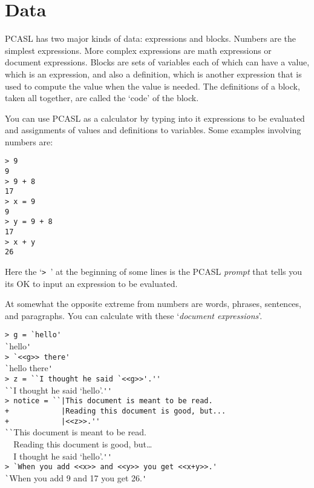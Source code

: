 \documentclass[12pt]{article}
\newcommand{\key}[1]{{\em #1}\index{#1}}
\newcommand{\skey}[2]{{\em #1#2}\index{#1}}
\newenvironment{indpar}[1][0.3in]%
	{\begin{list}{}%
		     {\setlength{\itemsep}{0in}%
		      \setlength{\topsep}{0in}%
		      \setlength{\parsep}{1ex}%
		      \setlength{\labelwidth}{#1}%
		      \setlength{\leftmargin}{#1}%
		      \addtolength{\leftmargin}{\labelsep}}%
	 \item}%
	{\end{list}}
\begin{document}
\section{Data}

PCASL has two major kinds of data: expressions and blocks.  Numbers are
the simplest expressions.  More complex expressions are math
expressions or document expressions.  Blocks are sets of variables
each of which can have a value, which is an expression, and also
a definition, which is another expression that is used to compute the
value when the value is needed.  The definitions of a block, taken all
together, are called the `code' of the block.

You can use PCASL as a calculator by typing into it expressions to
be evaluated and assignments of values and definitions to variables.
Some examples involving numbers are:

\begin{indpar}\begin{verbatim}
> 9
9
> 9 + 8
17
> x = 9
9
> y = 9 + 8
17
> x + y
26
\end{verbatim}\end{indpar}

Here the `\verb|> |' at the beginning of some lines is the PCASL \key{prompt}
that tells you its OK to input an expression to be evaluated.

At somewhat the opposite extreme from numbers are words, phrases, sentences,
and paragraphs.  You can calculate with these `\skey{document expression}s'.

\begin{indpar}
\verb|> g = `hello'| \\
\verb|`|hello\verb|'| \\
\verb|> `<<g>> there'| \\
\verb|`|hello there\verb|'| \\
\verb|> z = ``I thought he said `<<g>>'.''| \\
\verb|``|I thought he said `hello'.\verb|''| \\
\verb/> notice = ``|This document is meant to be read./ \\
\verb/+            |Reading this document is good, but.../ \\
\verb/+            |<<z>>.''/ \\
\verb|``|This document is meant to be read. \\
\verb|  |Reading this document is good, but\ldots \\
\verb|  |I thought he said `hello'.\verb|''| \\
\verb|> `When you add <<x>> and <<y>> you get <<x+y>>.'| \\
\verb|`|When you add 9 and 17 you get 26.\verb|'|
\end{indpar}
\end{document}
